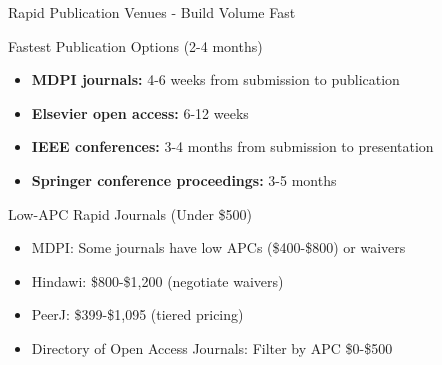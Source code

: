 \documentclass[11pt]{beamer}
\begin{document}
	\begin{frame}{Rapid Publication Venues - Build Volume Fast}
		\scriptsize
		\begin{block}{Fastest Publication Options (2-4 months)}
			\begin{itemize}
				\item \textbf{MDPI journals:} 4-6 weeks from submission to publication
				\item \textbf{Elsevier open access:} 6-12 weeks
				\item \textbf{IEEE conferences:} 3-4 months from submission to presentation
				\item \textbf{Springer conference proceedings:} 3-5 months
			\end{itemize}
		\end{block}
		\begin{block}{Low-APC Rapid Journals (Under \$500)}
			\begin{itemize}
				\item MDPI: Some journals have low APCs (\$400-\$800) or waivers
				\item Hindawi: \$800-\$1,200 (negotiate waivers)
				\item PeerJ: \$399-\$1,095 (tiered pricing)
				\item Directory of Open Access Journals: Filter by APC \$0-\$500
			\end{itemize}
		\end{block}
	\end{frame}
	
\end{document}
